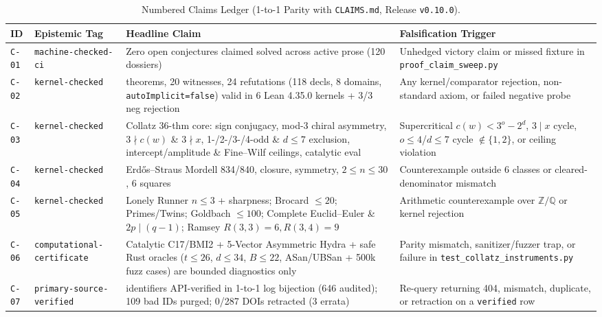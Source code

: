 \documentclass[11pt,reqno]{amsart}
\theoremstyle{plain}
\theoremstyle{definition}
\newcommand{\Z}{\mathbb{Z}}
\newcommand{\Q}{\mathbb{Q}}
\newcommand{\code}[1]{{\upshape\nolinkurl{#1}}}
\begin{document}
\begin{table}[htbp]
\centering
\caption{Numbered Claims Ledger (1-to-1 Parity with \code{CLAIMS.md}, Release \texttt{v0.10.0}).}
\label{tab:claims}
\scriptsize
\setlength{\tabcolsep}{3.5pt}
\begin{tabularx}{\textwidth}{@{}l>{\raggedright\arraybackslash}p{3.4cm}>{\raggedright\arraybackslash}X>{\raggedright\arraybackslash}X@{}}
\toprule
ID & Epistemic Tag & Headline Claim & Falsification Trigger \\
\midrule
\code{C-01} & \code{machine-checked-ci} & Zero open conjectures claimed solved across active prose (120 dossiers) & Unhedged victory claim or missed fixture in \code{proof_claim_sweep.py} \\
\code{C-02} & \code{kernel-checked} & 74 theorems, 20 witnesses, 24 refutations (118 decls, 8 domains, \code{autoImplicit=false}) valid in 6 Lean 4.35.0 kernels + 3/3 neg rejection & Any kernel/comparator rejection, non-standard axiom, or failed negative probe \\
\code{C-03} & \code{kernel-checked} & Collatz 36-thm core: sign conjugacy, mod-3 chiral asymmetry, $3 \nmid c(w)$ \& $3 \nmid x$, 1-/2-/3-/4-odd \& $d\le 7$ exclusion, intercept/amplitude \& Fine--Wilf ceilings, catalytic eval & Supercritical $c(w)<3^o-2^d$, $3\mid x$ cycle, $o\le 4$/$d\le 7$ cycle $\notin\{1,2\}$, or ceiling violation \\
\code{C-04} & \code{kernel-checked} & Erd\H{o}s--Straus Mordell 834/840, closure, symmetry, $2\le n\le 30$, 6 squares & Counterexample outside 6 classes or cleared-denominator mismatch \\
\code{C-05} & \code{kernel-checked} & Lonely Runner $n\le 3$ + sharpness; Brocard $\le 20$; Primes/Twins; Goldbach $\le 100$; Complete Euclid--Euler \& $2p\mid(q-1)$; Ramsey $R(3,3)=6, R(3,4)=9$ & Arithmetic counterexample over $\Z/\Q$ or kernel rejection \\
\code{C-06} & \code{computational-certificate} & Catalytic C17/BMI2 + 5-Vector Asymmetric Hydra + safe Rust oracles ($t\le 26$, $d\le 34$, $B\le 22$, ASan/UBSan + 500k fuzz cases) are bounded diagnostics only & Parity mismatch, sanitizer/fuzzer trap, or failure in \code{test_collatz_instruments.py} \\
\code{C-07} & \code{primary-source-verified} & 537 identifiers API-verified in 1-to-1 log bijection (646 audited); 109 bad IDs purged; 0/287 DOIs retracted (3 errata) & Re-query returning 404, mismatch, duplicate, or retraction on a \code{verified} row \\

\end{tabularx}
\end{table}
\end{document}

